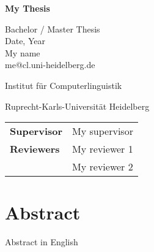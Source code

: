 
\sffamily
{} %
\pagestyle{empty}

\clearscrheadings\clearscrplain



\begin{center}

\begin{Huge}
\vspace{10mm}
\textbf{My Thesis}
\end{Huge}


\vspace{70mm}
\begin{large}
Bachelor / Master Thesis\\
Date, Year\\

\vspace{1 cm}
My name\\
me@cl.uni-heidelberg.de\\
\end{large}
\vspace{2cm}

\begin{Large}
Institut für Computerlinguistik\\ %
\vspace{3mm}
\end{Large}{\Large Ruprecht-Karls-Universität Heidelberg}\\ %
\vspace{2cm}

\begin{tabular}{ll}
\textbf{Supervisor} & My supervisor\\
\textbf{Reviewers} & My reviewer 1\\
 & My reviewer 2\\
\end{tabular}
\end{center}

\clearpage


\pagestyle{useheadings} %

\chapter*{Abstract}\label{c.abstract}
Abstract in English

